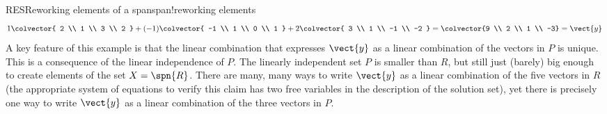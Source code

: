 \begin{example}{RES}{Reworking elements of a span}{span!reworking elements}
%
\begin{equation*}
1\colvector{ 2 \\ 1 \\ 3 \\ 2 }+
(-1)\colvector{ -1 \\ 1 \\ 0 \\ 1 }+
2\colvector{ 3 \\ 1 \\ -1 \\ -2 }
=\colvector{9 \\ 2 \\ 1 \\ -3}
=\vect{y}
\end{equation*}
%
A key feature of this example is that the linear combination that expresses $\vect{y}$ as a linear combination of the vectors in $P$ is unique.  This is a consequence of the linear independence of $P$.  The linearly independent set $P$ is smaller than $R$, but still just (barely) big enough to create elements of the set $X=\spn{R}$.  There are many, many ways to write $\vect{y}$ as a linear combination of the five vectors in $R$ (the appropriate system of equations to verify this claim has two free variables in the description of the solution set), yet there is precisely one way to write $\vect{y}$ as a linear combination of the three vectors in $P$.
\end{example}
%
%

